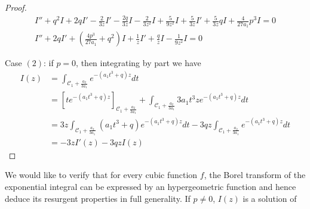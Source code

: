 \documentclass[11pt,a4paper,twoside,leqno,noamsfonts]{amsart}
\numberwithin{equation}{section}
\begin{document}
\begin{proof}
\begin{align*}
I''+q^2I+2qI'-\frac{2}{3z}I'-\frac{2q}{3z}I-\frac{2}{3z^2}I+\frac{5}{9z^2}I+\frac{5}{3z}I'+\frac{5}{3z}qI+\frac{4}{27a_1}p^3I=0\\
I''+2qI'+\left(\frac{4p^3}{27a_1}+q^2\right)I+\frac{1}{z}I'+\frac{q}{z}I-\frac{1}{9z^2}I=0
\end{align*}

Case $(2)$: if $p=0$, then integrating by part we have
\begin{align*}
I(z)&=\int_{\mathcal{C}_1+\frac{a_2}{3a_1}}e^{-(a_1t^3+q)z}dt\\
&=\left[te^{-(a_1t^3+q)z}\right]_{\mathcal{C}_1+\frac{a_2}{3a_1}}+\int_{\mathcal{C}_1+\frac{a_2}{3a_1}}3a_1t^3ze^{-(a_1t^3+q)z}dt\\
&=3z\int_{\mathcal{C}_1+\frac{a_2}{3a_1}}(a_1t^3+q)e^{-(a_1t^3+q)z}dt-3qz\int_{\mathcal{C}_1+\frac{a_2}{3a_1}}e^{-(a_1t^3+q)z}dt\\
&=-3zI'(z)-3qzI(z)
\end{align*}
\end{proof}
 
We would like to verify that for every cubic function $f$, the Borel transform of the exponential integral can be expressed by an hypergeometric function and hence deduce its resurgent properties in full generality. If $p\neq 0$, $I(z)$ is a solution of
\end{document}
